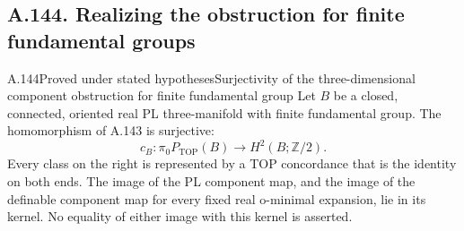 \subsection{A.144. Realizing the obstruction for finite fundamental groups}

\begin{saresult}{A.144}{Proved under stated hypotheses}{Surjectivity of the three-dimensional component obstruction for finite fundamental group}
Let $B$ be a closed, connected, oriented real PL three-manifold with
finite fundamental group. The homomorphism of A.143 is surjective:
\[
 c_B:\pi_0P_{\mathrm{TOP}}(B)\longrightarrow
                  H^2(B;\mathbb Z/2).
 \tag{144.1}
\]
Every class on the right is represented by a TOP concordance that is
the identity on both ends. The image of the PL component map, and the
image of the definable component map for every fixed real o-minimal
expansion, lie in its kernel. No equality of either image with this
kernel is asserted.
\end{saresult}

